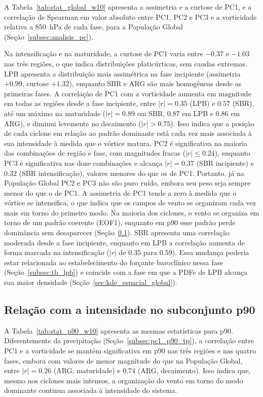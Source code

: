A Tabela~\ref{tab:stat_global_w10} apresenta a assimetria e a curtose de PC1, e a correlação de Spearman em valor absoluto entre PC1, PC2 e PC3 e a vorticidade relativa a 850~hPa de cada fase, para a População Global (Seção~\ref{subsec:analisis_pc}).

Na intensificação e na maturidade, a curtose de PC1 varia entre $-0.37$ e $-1.03$ nas três regiões, o que indica distribuições platicúrticas, sem caudas extremas. LPB apresenta a distribuição mais assimétrica na fase incipiente (assimetria $+0.99$, curtose $+1.32$), enquanto SBR e ARG são mais homogêneas desde as primeiras fases. A correlação de PC1 com a vorticidade aumenta em magnitude em todas as regiões desde a fase incipiente, entre $|r|=0.35$ (LPB) e $0.57$ (SBR), até um máximo na maturidade ($|r|=0.89$ em SBR, $0.87$ em LPB e $0.86$ em ARG), e diminui levemente no decaimento ($|r| > 0.75$). Isso indica que a posição de cada ciclone em relação ao padrão dominante está cada vez mais associada à sua intensidade à medida que o vórtice matura. PC2 é significativa na maioria das combinações de região e fase, com magnitudes fracas ($|r| \leq 0.24$), enquanto PC3 é significativa nas doze combinações e alcança $|r|=0.37$ (SBR incipiente) e $0.32$ (SBR intensificação), valores menores do que os de PC1. Portanto, já na População Global PC2 e PC3 não são puro ruído, embora seu peso seja sempre menor do que o de PC1.
A assimetria de PC1 tende a zero à medida que o vórtice se intensifica, o que indica que os campos de vento se organizam cada vez mais em torno do primeiro modo. Na maioria dos ciclones, o vento se organiza em torno de um padrão coerente (EOF1), enquanto em p90 esse padrão perde dominância sem desaparecer (Seção~\ref{subsec:pc1_p90_wind10}).
SBR apresenta uma correlação moderada desde a fase incipiente, enquanto em LPB a correlação aumenta de forma marcada na intensificação ($|r|$ de $0.35$ para $0.59$). Essa mudança poderia estar relacionada ao estabelecimento do forçante baroclínico nessa fase (Seção~\ref{subsec:tb_lpb}) e coincide com a fase em que a PDFe de LPB alcança sua maior densidade (Seção~\ref{sec:kde_espacial_global}).



\subsection{Relação com a intensidade no subconjunto p90}\label{subsec:pc1_p90_wind10}

A Tabela~\ref{tab:stat_p90_w10} apresenta as mesmas estatísticas para p90. Diferentemente da precipitação (Seção~\ref{subsec:pc1_p90_tp}), a correlação entre PC1 e a vorticidade se mantém significativa em p90 nas três regiões e nas quatro fases, embora com valores de menor magnitude do que na População Global, entre $|r|=0.26$ (ARG, maturidade) e $0.74$ (ARG, decaimento). Isso indica que, mesmo nos ciclones mais intensos, a organização do vento em torno do modo dominante continua associada à intensidade do sistema.

